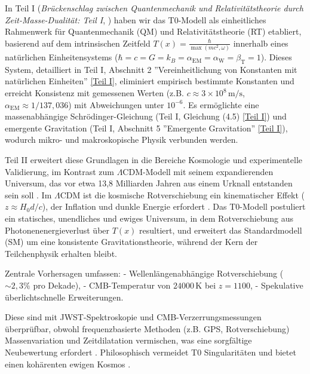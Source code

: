\documentclass[twocolumn,aps,prl]{revtex4-2}
\newcommand{\Tfield}{T(x)}
\newcommand{\alphaEM}{\alpha_{\text{EM}}}
\newcommand{\alphaW}{\alpha_{\text{W}}}
\newcommand{\betaT}{\beta_{\text{T}}}
\newcommand{\LCDM}{\Lambda\text{CDM}}
\begin{document}
	In Teil I (\textit{Brückenschlag zwischen Quantenmechanik und Relativitätstheorie durch Zeit-Masse-Dualität: Teil I}, \cite{pascher_part1_2025}) haben wir das T0-Modell als einheitliches Rahmenwerk für Quantenmechanik (QM) und Relativitätstheorie (RT) etabliert, basierend auf dem intrinsischen Zeitfeld \(\Tfield = \frac{\hbar}{\max(mc^2, \omega)}\) innerhalb eines natürlichen Einheitensystems (\(\hbar = c = G = k_B = \alphaEM = \alphaW = \betaT = 1\)). Dieses System, detailliert in Teil I, Abschnitt 2 ''Vereinheitlichung von Konstanten mit natürlichen Einheiten'' \href{https://github.com/jpascher/T0-Time-Mass-Duality/tree/main/2/pdf/Deutsch/QMRelTimeMassPart1.pdf}{[Teil I]}, eliminiert empirisch bestimmte Konstanten und erreicht Konsistenz mit gemessenen Werten (z.B. \(c \approx 3 \times 10^8 \, \text{m/s}\), \(\alphaEM \approx 1/137,036\)) mit Abweichungen unter \(10^{-6}\). Es ermöglichte eine massenabhängige Schrödinger-Gleichung (Teil I, Gleichung (4.5) \href{https://github.com/jpascher/T0-Time-Mass-Duality/tree/main/2/pdf/Deutsch/QMRelTimeMassPart1.pdf}{[Teil I]}) und emergente Gravitation (Teil I, Abschnitt 5 ''Emergente Gravitation'' \href{https://github.com/jpascher/T0-Time-Mass-Duality/tree/main/2/pdf/Deutsch/QMRelTimeMassPart1.pdf}{[Teil I]}), wodurch mikro- und makroskopische Physik verbunden werden.
	
	Teil II erweitert diese Grundlagen in die Bereiche Kosmologie und experimentelle Validierung, im Kontrast zum \(\LCDM\)-Modell mit seinem expandierenden Universum, das vor etwa 13,8 Milliarden Jahren aus einem Urknall entstanden sein soll \cite{Planck2020}. Im \(\LCDM\) ist die kosmische Rotverschiebung ein kinematischer Effekt (\(z \approx H_0 d / c\)), der Inflation und dunkle Energie erfordert \cite{Riess1998,Perlmutter1999}. Das T0-Modell postuliert ein statisches, unendliches und ewiges Universum, in dem Rotverschiebung aus Photonenenergieverlust über \(\Tfield\) resultiert, und erweitert das Standardmodell (SM) um eine konsistente Gravitationstheorie, während der Kern der Teilchenphysik erhalten bleibt.
	
	Zentrale Vorhersagen umfassen:
	- Wellenlängenabhängige Rotverschiebung (\(\sim 2,3\%\) pro Dekade),
	- CMB-Temperatur von \(24000 \, \text{K}\) bei \(z = 1100\),
	- Spekulative überlichtschnelle Erweiterungen.
	
	Diese sind mit JWST-Spektroskopie und CMB-Verzerrungsmessungen überprüfbar, obwohl frequenzbasierte Methoden (z.B. GPS, Rotverschiebung) Massenvariation und Zeitdilatation vermischen, was eine sorgfältige Neubewertung erfordert \cite{pascher_quantum_2025}. Philosophisch vermeidet T0 Singularitäten und bietet einen kohärenten ewigen Kosmos \cite{pascher_perspective_2025}.
	
\end{document}
